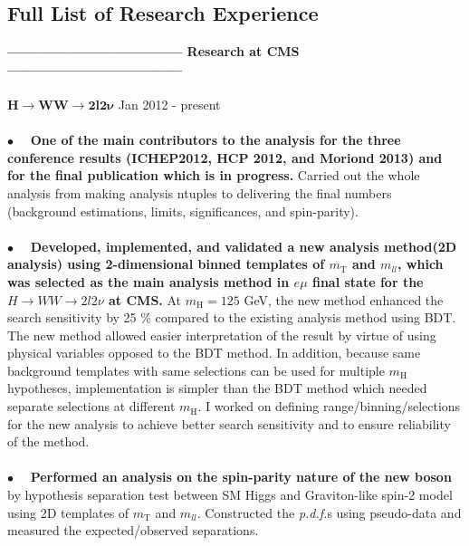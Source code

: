 \documentclass[margin]{res}
\begin{document}
\begin{resume}
\newpage
\section{Full List of Research Experience}
\textbf{------------------------------------ 
                Research at CMS 
        ------------------------------------} 
\\
\\
\textbf{$\mathbf{H\rightarrow WW \rightarrow 2l2\nu}$} 
        \hfill Jan 2012 - present 
    \\   
    \\
      $\bullet\quad$  \textbf{One of the main contributors to the analysis for the three conference results
      (ICHEP2012, HCP 2012, and Moriond 2013) and for the final publication which is in progress.} 
      Carried out the whole analysis from making analysis ntuples to delivering  the 
      final numbers (background estimations, limits, significances, and spin-parity).
    \\
    \\
      $\bullet\quad$ \textbf{Developed, implemented, and validated a new analysis method(2D analysis) 
      using 2-dimensional binned templates of $m_{\mathrm{T}}$ and $m_{ll}$, which was selected 
      as the main analysis method in $e\mu$ final state for the $H\rightarrow WW \rightarrow 2l2\nu$ at CMS.}
      At $m_{\mathrm{H}}=125$ GeV,
      the new method enhanced the search sensitivity by 25 \% compared to the existing 
      analysis method using BDT. The new method allowed easier interpretation of the result 
      by virtue of using physical variables opposed to the BDT method. 
      In addition, because same background templates with same selections can be used 
      for multiple $m_{\mathrm{H}}$ hypotheses, implementation is simpler 
      than the BDT method which needed separate selections at different $m_{\mathrm{H}}$. 
      I worked on defining range/binning/selections for the new 
      analysis to achieve better search sensitivity and to ensure reliability of the method. 
    \\
    \\
    $\bullet\quad$  \textbf{Performed an analysis on the spin-parity nature of the new boson} 
      by hypothesis separation test between SM Higgs and Graviton-like spin-2 model using 
      2D templates of $m_{\mathrm{T}}$ and $m_{ll}$. 
      Constructed the \textit{p.d.f.}s  using pseudo-data 
      and measured the expected/observed separations. 

\end{resume}
\end{document}
